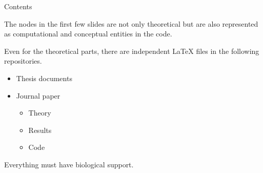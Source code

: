 \begin{frame}[allowframebreaks]{Contents}
    
    The nodes in the first few slides are not only theoretical but are also represented as computational and conceptual entities in the code.
    
    Even for the theoretical parts, there are independent LaTeX files in the following repositories.
    \begin{itemize}
        \item Thesis documents
        \item Journal paper
        \begin{itemize}
            \item Theory
            \item Results
            \item Code
            
        \end{itemize}
    \end{itemize}
    
    
    
    Everything must have biological support.
    
\end{frame}